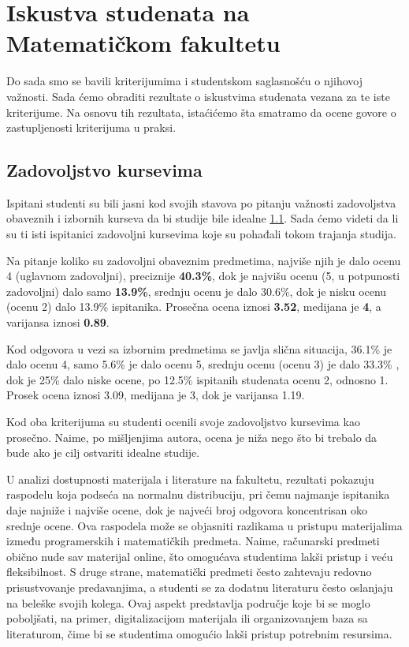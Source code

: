 \documentclass[a4paper]{article}
\begin{document}
{\section{Iskustva studenata na Matematičkom fakultetu}
\label{sec:iskustva}

Do sada smo se bavili kriterijumima i studentskom saglasnošću o njihovoj važnosti. Sada ćemo obraditi rezultate o iskustvima studenata vezana za te iste kriterijume. Na osnovu tih rezultata, istaćićemo šta smatramo da ocene govore o zastupljenosti kriterijuma u praksi.  

\subsection{Zadovoljstvo kursevima}
\label{subsec:zadovoljstvo_iskustva}
Ispitani studenti su bili jasni kod svojih stavova po pitanju važnosti zadovoljstva obaveznih i izbornih kurseva da bi studije bile idealne \ref{subsec:zadovoljstvo_iskustva}. Sada ćemo videti da li su ti isti ispitanici zadovoljni kursevima koje su pohađali tokom trajanja studija.

Na pitanje koliko su zadovoljni obaveznim predmetima, najviše njih je dalo ocenu 4 (uglavnom zadovoljni), preciznije \textbf{40.3\%}, dok je najvišu ocenu (5, u potpunosti zadovoljni) dalo samo \textbf{13.9\%}, srednju ocenu je dalo 30.6\%, dok je nisku ocenu (ocenu 2) dalo 13.9\% ispitanika. Prosečna ocena iznosi \textbf{3.52}, medijana je \textbf{4}, a varijansa iznosi  \textbf{0.89}.

Kod odgovora u vezi sa izbornim predmetima se javlja slična situacija, 36.1\% je dalo ocenu 4, samo 5.6\% je dalo ocenu 5, srednju ocenu (ocenu 3) je dalo 33.3\% , dok je 25\% dalo niske ocene, po 12.5\% ispitanih studenata ocenu 2, odnosno 1. Prosek ocena iznosi 3.09, medijana je 3, dok je varijansa 1.19. 

Kod oba kriterijuma su studenti ocenili svoje zadovoljstvo kursevima kao prosečno. Naime, po mišljenjima autora, ocena je niža nego što bi trebalo da bude ako je cilj ostvariti idealne studije.

U analizi dostupnosti materijala i literature na fakultetu, rezultati pokazuju raspodelu koja podseća na normalnu distribuciju, pri čemu najmanje ispitanika daje najniže i najviše ocene, dok je najveći broj odgovora koncentrisan oko srednje ocene. Ova raspodela može se objasniti razlikama u pristupu materijalima između programerskih i matematičkih predmeta. Naime, računarski predmeti obično nude sav materijal online, što omogućava studentima lakši pristup i veću fleksibilnost. S druge strane, matematički predmeti često zahtevaju redovno prisustvovanje predavanjima, a studenti se za dodatnu literaturu često oslanjaju na beleške svojih kolega. Ovaj aspekt predstavlja područje koje bi se moglo poboljšati, na primer, digitalizacijom materijala ili organizovanjem baza sa literaturom, čime bi se studentima omogućio lakši pristup potrebnim resursima.

}
\end{document}
